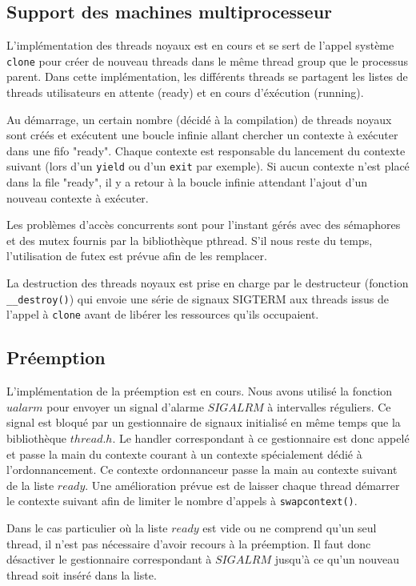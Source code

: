 \subsection{Support des machines multiprocesseur}

L'implémentation des threads noyaux est en cours et se sert de l'appel système
\verb!clone! pour créer de nouveau threads dans le même thread group que le
processus parent. Dans cette implémentation, les différents threads se
partagent les listes de threads utilisateurs en attente (ready) et en cours
d'éxécution (running).

Au démarrage, un certain nombre (décidé à la compilation) de threads noyaux
sont créés et exécutent une boucle infinie allant chercher un contexte à
exécuter dans une fifo "ready". Chaque contexte est responsable du lancement du
contexte suivant (lors d'un \verb!yield! ou d'un \verb!exit! par exemple). Si
aucun contexte n'est placé dans la file "ready", il y a retour à la boucle
infinie attendant l'ajout d'un nouveau contexte à exécuter.

Les problèmes d'accès concurrents sont pour l'instant gérés avec des sémaphores
et des mutex fournis par la bibliothèque pthread. S'il nous reste du temps,
l'utilisation de futex est prévue afin de les remplacer.

La destruction des threads noyaux est prise en charge par le destructeur
(fonction \verb!__destroy()!) qui envoie une série de signaux SIGTERM aux
threads issus de l'appel à \verb!clone! avant de libérer les ressources qu'ils
occupaient.


\subsection{Préemption} 

L'implémentation de la préemption est en cours. Nous avons utilisé la fonction
$ualarm$ pour envoyer un signal d'alarme $SIGALRM$ à intervalles réguliers. Ce
signal est bloqué par un gestionnaire de signaux initialisé en même temps que
la bibliothèque $thread.h$. Le handler correspondant à ce gestionnaire est donc
appelé et passe la main du contexte courant à un contexte spécialement dédié à
l'ordonnancement. Ce contexte ordonnanceur passe la main au contexte suivant de
la liste $ready$. Une amélioration prévue est de laisser chaque thread démarrer
le contexte suivant afin de limiter le nombre d'appels à \verb!swapcontext()!.

Dans le cas particulier où la liste $ready$ est vide ou ne comprend qu'un seul
thread, il n'est pas nécessaire d'avoir recours à la préemption. Il faut donc
désactiver le gestionnaire correspondant à $SIGALRM$ jusqu'à ce qu'un nouveau
thread soit inséré dans la liste.

